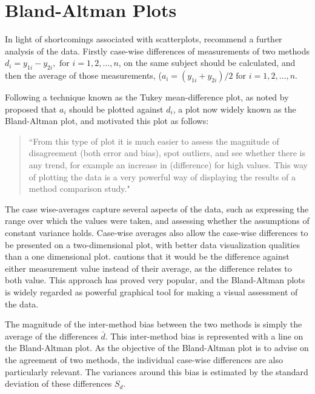 \documentclass[12pt, a4paper]{report}
\theoremstyle{plain}
\theoremstyle{definition}
\theoremstyle{remark}
\begin{document}
	\section{Bland-Altman Plots}
	
	In light of shortcomings associated with scatterplots,
	\citet*{BA83} recommend a further analysis of the data. Firstly
	case-wise differences of measurements of two methods $d_{i} =
	y_{1i}-y_{2i}, \mbox{ for }i=1,2,\dots,n$, on the same subject
	should be calculated, and then the average of those measurements, 
	($a_{i} = (y_{1i} + y_{2i})/2 \mbox{ for }i=1,2,\dots, n$.
	
	Following a technique known as the Tukey mean-difference plot, as noted by \citet{kozak2014including}
	\citet{BA83} proposed that $a_i$ should be plotted against $d_i$, a plot now widely known as the Bland-Altman plot, and motivated this plot as follows:
	\begin{quote}
		``From this type of plot it is much easier to assess the magnitude
		of disagreement (both error and bias), spot outliers, and see
		whether there is any trend, for example an increase in (difference) for high values. This way of plotting the data is a very powerful way of displaying the results of a method comparison study."
	\end{quote}
	
The case wise-averages capture several aspects of the data, such as expressing the range over which the values were taken, and assessing whether the assumptions of constant variance holds. Case-wise averages also allow the case-wise differences to be presented on a two-dimensional plot, with better data visualization qualities than a one dimensional plot. \citet{BA86}
	cautions that it would be the difference against either measurement value instead of their average, as the difference relates to both value. This approach has proved very popular, and the Bland-Altman plots is widely regarded as powerful graphical tool for making a visual assessment of the data.
	
The magnitude of the inter-method bias between the two methods is simply the average of the differences $\bar{d}$. This inter-method bias is represented with a line on the Bland-Altman plot. As the objective of the Bland-Altman plot is to advise on the agreement of two methods, the individual case-wise differences are also particularly relevant. The variances around this bias is estimated by the standard deviation of these differences $S_{d}$.
	
\end{document}
